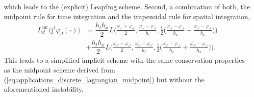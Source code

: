 \documentclass[12pt,a4paper,reqno]{article}
\begin{document}
which leads to the (explicit) Leapfrog scheme.
Second, a combination of both, the midpoint rule for time integration and the trapezoidal rule for spatial integration,
\begin{align}\label{eq:applications_discrete_lagrangian_simplified}
L_{d}^{\mathrm{mt}} \big( {\ensuremath{\mathrm{j}}}^{1} {\ensuremath{\varphi}}_{d} (\square) \big)
\nonumber
&= \dfrac{h_{t} h_{x}}{2} L \bigg(
\tfrac{{\ensuremath{\varphi}}_{\square^{1}} + {\ensuremath{\varphi}}_{\square^{4}}}{2},
\tfrac{{\ensuremath{\varphi}}_{\square^{4}} - {\ensuremath{\varphi}}_{\square^{1}}}{h_{t}},
\tfrac{1}{2} \Big(
   \tfrac{{\ensuremath{\varphi}}_{\square^{2}} - {\ensuremath{\varphi}}_{\square^{1}}}{h_{x}}
 + \tfrac{{\ensuremath{\varphi}}_{\square^{3}} - {\ensuremath{\varphi}}_{\square^{4}}}{h_{x}}
\Big)
\bigg)  \\
&+ \dfrac{h_{t} h_{x}}{2} L \bigg(
\tfrac{{\ensuremath{\varphi}}_{\square^{2}} + {\ensuremath{\varphi}}_{\square^{3}}}{2},
\tfrac{{\ensuremath{\varphi}}_{\square^{3}} - {\ensuremath{\varphi}}_{\square^{2}}}{h_{t}},
\tfrac{1}{2} \Big(
   \tfrac{{\ensuremath{\varphi}}_{\square^{2}} - {\ensuremath{\varphi}}_{\square^{1}}}{h_{x}}
 + \tfrac{{\ensuremath{\varphi}}_{\square^{3}} - {\ensuremath{\varphi}}_{\square^{4}}}{h_{x}}
\Big)
\bigg) .
\end{align}
This leads to a simplified implicit scheme with the same conservation properties as the midpoint scheme derived from (\ref{eq:applications_discrete_lagrangian_midpoint}) but without the aforementioned instability.
\end{document}
